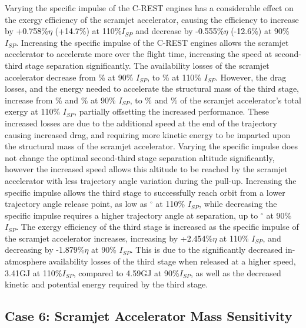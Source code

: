 Varying the specific impulse of the C-REST engines has a considerable effect on the exergy efficiency of the scramjet accelerator, causing the efficiency to increase by \textcolor{black}{+0.758}\%$\eta$ (\textcolor{black}{+14.7}\%) at 110\%$I_{SP}$ and decrease by \textcolor{black}{-0.555}\%$\eta$ (\textcolor{black}{-12.6}\%) at 90\% $I_{SP}$. 
Increasing the specific impulse of the C-REST engines allows the scramjet accelerator to accelerate more over the flight time, increasing the speed at second-third stage separation significantly. The availability losses of the scramjet accelerator decrease from \PlosssecondIspNinetyNoReturn\% at 90\% $I_{SP}$, to \PlosssecondIspOneHundredTenNoReturn \% at 110\% $I_{SP}$. However, the drag losses, and the energy needed to accelerate the structural mass of the third stage, increase from \WDsecondIspNinetyNoReturn\% and \WsecondIspNinetyNoReturn\% at 90\% $I_{SP}$, to \WDsecondIspOneHundredTenNoReturn\% and \WsecondIspOneHundredTenNoReturn\% of the scramjet accelerator's total exergy at 110\% $I_{SP}$, partially offsetting the increased performance. These increased losses are due to the additional speed at the end of the trajectory causing increased drag, and requiring more kinetic energy to be imparted upon the structural mass of the scramjet accelerator. 
 Varying the specific impulse does not change the optimal second-third stage separation altitude significantly, however the increased speed allows this altitude to be reached by the scramjet accelerator with less trajectory angle variation during the pull-up. Increasing the specific impulse allows the third stage to successfully reach orbit from a lower trajectory angle release point, as low as \secondthirdSeparationgammaIspOneHundredTenNoReturn$^\circ$ at 110\% $I_{SP}$, while decreasing the specific impulse requires a higher trajectory angle at separation, up to \secondthirdSeparationgammaIspNinetyNoReturn$^\circ$ at 90\% $I_{SP}$.
The exergy efficiency of the third stage is increased as the specific impulse of the scramjet accelerator increases, increasing by \textcolor{black}{+2.454}\%$\eta$ at 110\% $I_{SP}$, and decreasing by \textcolor{black}{-1.879}\%$\eta$ at 90\% $I_{SP}$. This is due to the significantly decreased in-atmosphere availability losses of the third stage when released at a higher speed, 3.41GJ at 110\%$I_{SP}$, compared to 4.59GJ at 90\%$I_{SP}$, as well as the decreased kinetic and potential energy required by the third stage. 

\subsection{Case 6: Scramjet Accelerator Mass Sensitivity}\label{sec:SpartanMassnoreturn}

